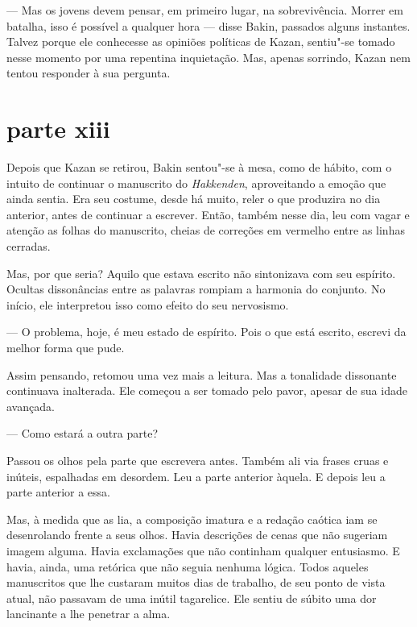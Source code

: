 --- Mas os jovens devem pensar, em primeiro lugar, na sobrevivência.
Morrer em batalha, isso é possível a qualquer hora --- disse Bakin,
passados alguns instantes. Talvez porque ele conhecesse as opiniões
políticas de Kazan, sentiu"-se tomado nesse momento por uma repentina
inquietação. Mas, apenas sorrindo, Kazan nem tentou responder à sua
pergunta.

\section*{parte xiii}

Depois que Kazan se retirou, Bakin sentou"-se à mesa, como de hábito, com
o intuito de continuar o manuscrito do \textit{Hakkenden}, aproveitando
a emoção que ainda sentia. Era seu costume, desde há muito, reler o que
produzira no dia anterior, antes de continuar a escrever. Então, também
nesse dia, leu com vagar e atenção as folhas do manuscrito, cheias de
correções em vermelho entre as linhas cerradas.

Mas, por que seria? Aquilo que estava escrito não sintonizava com seu
espírito. Ocultas dissonâncias entre as palavras rompiam a harmonia do
conjunto. No início, ele interpretou isso como efeito do seu
nervosismo.

--- O problema, hoje, é meu estado de espírito. Pois o que está escrito,
escrevi da melhor forma que pude.

Assim pensando, retomou uma vez mais a leitura. Mas a tonalidade
dissonante continuava inalterada. Ele começou a ser tomado pelo pavor,
apesar de sua idade avançada.

--- Como estará a outra parte?

Passou os olhos pela parte que escrevera antes. Também ali via frases 
cruas e inúteis, espalhadas em desordem. Leu a parte anterior àquela. E
depois leu a parte anterior a essa.

Mas, à medida que as lia, a composição imatura e a redação caótica iam
se desenrolando frente a seus olhos. Havia descrições de cenas que não
sugeriam imagem alguma. Havia exclamações que não continham qualquer
entusiasmo. E havia, ainda, uma retórica que não seguia nenhuma lógica.
Todos aqueles manuscritos que lhe custaram muitos dias de trabalho, de
seu ponto de vista atual, não passavam de uma inútil tagarelice. Ele
sentiu de súbito uma dor lancinante a lhe penetrar a alma.

